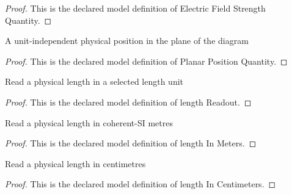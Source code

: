 \begin{proof}
  This is the declared model definition of Electric Field Strength Quantity.
\end{proof}
\begin{definition}
  \label{def:physics:phyx-mini-0870:phyxminiproblems-problemphyxmini0870-planarpositionquantity}
  A unit-independent physical position in the plane of the diagram
\end{definition}
\begin{proof}
  This is the declared model definition of Planar Position Quantity.
\end{proof}
\begin{definition}
  \label{def:physics:phyx-mini-0870:phyxminiproblems-problemphyxmini0870-lengthreadout}
  Read a physical length in a selected length unit
\end{definition}
\begin{proof}
  This is the declared model definition of length Readout.
\end{proof}
\begin{definition}
  \label{def:physics:phyx-mini-0870:phyxminiproblems-problemphyxmini0870-lengthinmeters}
  Read a physical length in coherent-SI metres
\end{definition}
\begin{proof}
  This is the declared model definition of length In Meters.
\end{proof}
\begin{definition}
  \label{def:physics:phyx-mini-0870:phyxminiproblems-problemphyxmini0870-lengthincentimeters}
  Read a physical length in centimetres
\end{definition}
\begin{proof}
  This is the declared model definition of length In Centimeters.
\end{proof}
